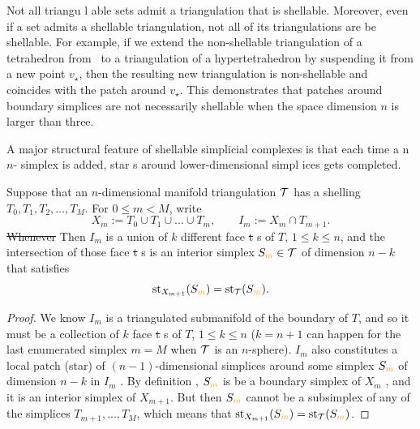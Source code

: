 \documentclass[10pt,letterpaper]{article}
\newcommand\cye[1]{%
  \protect\leavevmode
  \begingroup
    \color{red!35!yellow}%
    #1%
  \endgroup
}
\begin{document}
\begin{remark}
    Not all triangu\cye{l}able sets admit a triangulation that is shellable. 
    Moreover, even if a set admits a shellable triangulation, not all of its triangulations \cye{are} be shellable. \cye{For example, if we extend the non-shellable triangulation of a tetrahedron from~\cite[Example 8.9]{ziegler1995lectures}} to a triangulation of a hypertetrahedron by suspending it from a new point $v_\star$, 
    then the resulting new triangulation is non-shellable and coincides with the patch around $v_\star$.
    This demonstrates that patches around boundary simplices are not necessarily shellable when the \cye{space} dimension \cye{$n$} is larger than three.
\end{remark}


A major structural feature of shellable simplicial complexes 
is that each time a\cye{n $n$-}simplex is added, star\cye{s} around \cye{lower-dimensional} simpl\cye{ices} gets completed. 

\begin{lemma}\label{lemma:existenceofstar}
    Suppose that an $n$-dimensional manifold triangulation ${\mathcal T}$ has a shelling $T_{0}, T_{1}, T_{2}, \dots, T_{M}$.
    For $0 \leq m < M$, write 
    $$
        X_{m} := T_{0} \cup T_{1} \cup \dots \cup T_{m},
        \qquad 
        I_{m} := X_{m} \cap T_{m+1}.
    $$ 
    \cye{\sout{Whenever} Then} $I_{m}$ is \cye{a} union of $k$ different face\cye{\sout{t}}s of $T$, \cye{$1 \leq k \leq n$,} \cye{and} the intersection of those face\cye{\sout{t}}s is an interior simplex $S_{\cye{m}} \in \calT$ of dimension $n-k$ that satisfies 
    $$
        \patch_{X_{m+1}}(S_{\cye{m}}) = \patch_{\calT}(S_{\cye{m}}).
    $$
\end{lemma}
\begin{proof}
    We know $I_{m}$ is a \cye{triangulated} submanifold of the boundary of $T$, and so it must be a collection of $k$ face\cye{\sout{t}}s \cye{of $T$, $1 \leq k \leq n$ ($k = n + 1$ can happen for the last enumerated simplex $m = M$ when ${\mathcal T}$ is an $n$-sphere). $I_{m}$ also} constitutes \cye{a} local patch \cye{(star) of $(n-1)$-dimensional simplices around} some simplex $S_{\cye{m}}$ of dimension $n-k$ \cye{in $I_{m}$}.
    By \cye{definition}, $S_{\cye{m}}$ \cye{is} be a boundary simplex of $X_{m}$\cye{,} and it is an interior simplex of $X_{m+1}$. 
    But then $S_{\cye{m}}$ cannot be a subsimplex of any of the simplices $T_{m+1}, \dots, T_{M}$,
    which means that $\patch_{X_{m+1}}(S_{\cye{m}}) = \patch_{\calT}(S_{\cye{m}})$. 
\end{proof}
\end{document}
